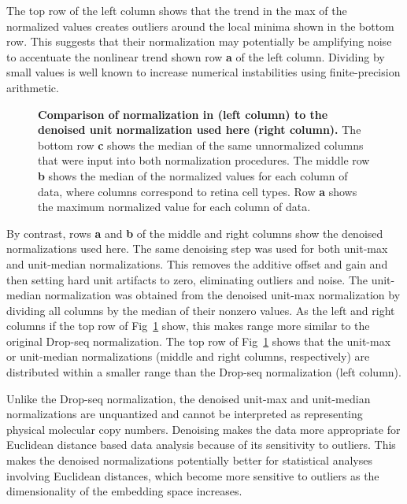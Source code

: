 \documentclass[10pt,letterpaper]{article}
\begin{document}
The top row of the left column shows that the trend in the max of the normalized values creates outliers around the local minima shown in the bottom row.
This suggests that their normalization may potentially be amplifying noise to accentuate the nonlinear trend shown row \textbf{a} of the left column.
Dividing by small values is well known to increase numerical instabilities using finite-precision arithmetic.
\begin{figure}[!h]
\caption{
{\bf Comparison of normalization in \cite{dropseq} (left column) to the denoised unit normalization used here (right column).}
The bottom row \textbf{c} shows the median of the same unnormalized columns that were input into both normalization procedures.
The middle row \textbf{b} shows the median of the normalized values for each column of data, where columns correspond to retina cell types.
Row \textbf{a} shows the maximum normalized value for each column of data.}
\label{fig:1}
\end{figure}
By contrast, rows \textbf{a} and \textbf{b} of the middle and right columns show the denoised normalizations used here.
The same denoising step was used for both unit-max and unit-median normalizations.
This removes the additive offset and gain and then setting hard unit artifacts to zero, eliminating outliers and noise.
The unit-median normalization was obtained from the denoised unit-max normalization by dividing all columns by the median of their nonzero values.
As the left and right columns if the top row of Fig~\ref{fig:1} show, this makes range more similar to the original Drop-seq normalization.
The top row of Fig~\ref{fig:1} shows that the unit-max or unit-median normalizations (middle and right columns, respectively) are distributed within a smaller range than the Drop-seq normalization (left column).

Unlike the Drop-seq normalization, the denoised unit-max and unit-median normalizations are unquantized and cannot be interpreted as representing physical molecular copy numbers.
Denoising makes the data more appropriate for Euclidean distance based data analysis because of its sensitivity to outliers.
This makes the denoised normalizations potentially better for statistical analyses involving Euclidean distances, which become more sensitive to outliers as the dimensionality of the embedding space increases.
\end{document}
